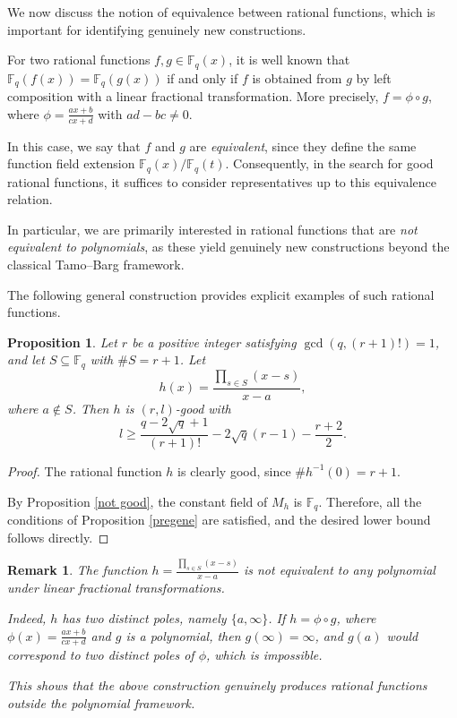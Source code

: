 \documentclass[1p,final]{elsarticle}
\newtheorem{proposition}[theorem]{Proposition}
\newtheorem{open problem}[theorem]{Open Problem}
\newtheorem{remark}[theorem]{Remark}
\begin{document}
\medskip

We now discuss the notion of equivalence between rational functions, which is important for identifying genuinely new constructions.

\medskip

For two rational functions $f,g\in \mathbb{F}_{q}(x)$, it is well known that $\mathbb{F}_{q}(f(x))=\mathbb{F}_{q}(g(x))$ if and only if $f$ is obtained from $g$ by left composition with a linear fractional transformation. More precisely, $f=\phi \circ g$, where $\phi=\displaystyle \frac{ax+b}{cx+d}$ with $ad-bc\ne 0$.

In this case, we say that $f$ and $g$ are \emph{equivalent}, since they define the same function field extension $\mathbb{F}_{q}(x)/\mathbb{F}_{q}(t)$. Consequently, in the search for good rational functions, it suffices to consider representatives up to this equivalence relation.

\medskip

In particular, we are primarily interested in rational functions that are \emph{not equivalent to polynomials}, as these yield genuinely new constructions beyond the classical Tamo--Barg framework.

\medskip

The following general construction provides explicit examples of such rational functions.

\begin{proposition}
Let $r$ be a positive integer satisfying $\gcd\left ( q,(r+1)! \right )=1$, and let $S\subseteq  \mathbb{F}_{q}$ with $\#S=r+1$. Let 
\[
h(x)=\displaystyle \frac{\prod_{s\in S}\left ( x-s \right )}{x-a},
\]
where $a\notin S$. Then $h$ is $(r,l)$-good with
\[
l\ge \frac{q-2\sqrt{q}+1}{(r+1)!}-2\sqrt{q}(r-1)-\frac{r+2}{2}.
\]
\end{proposition}

\begin{proof}
The rational function $h$ is clearly good, since $\#h^{-1}(0)=r+1$. 

By Proposition \ref{not good}, the constant field of $M_{h}$ is $\mathbb{F}_{q}$. Therefore, all the conditions of Proposition \ref{pregene} are satisfied, and the desired lower bound follows directly.
\end{proof}

\medskip

\begin{remark}
The function $h=\displaystyle \frac{\prod_{s\in S}\left ( x-s \right )}{x-a}$ is not equivalent to any polynomial under linear fractional transformations.

Indeed, $h$ has two distinct poles, namely $\{a, \infty\}$. If $h=\phi \circ g$, where $\phi(x)=\displaystyle \frac{ax+b}{cx+d}$ and $g$ is a polynomial, then $g(\infty)=\infty$, and $g(a)$ would correspond to two distinct poles of $\phi$, which is impossible.

This shows that the above construction genuinely produces rational functions outside the polynomial framework.
\end{remark}
\end{document}
